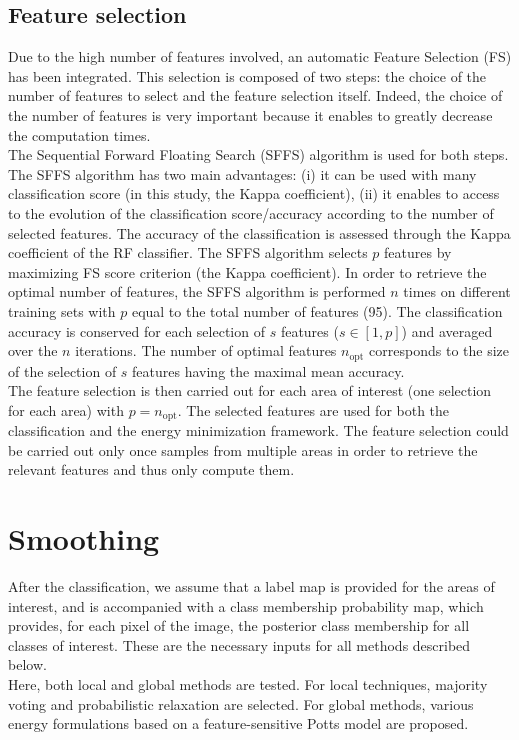 \subsection{Feature selection}
Due to the high number of features involved, an automatic Feature Selection (FS) has been integrated. This selection is composed of two steps: the choice of the number of features to select and the feature selection itself. Indeed, the choice of the number of features is very important because it enables to greatly decrease the computation times. \\
The Sequential Forward Floating Search (SFFS) \citep{pudil1994floating} algorithm is used for both steps. The SFFS algorithm has two main advantages: (i) it can be used with many classification score (in this study, the Kappa coefficient), (ii) it enables to access to the evolution of the classification score/accuracy according to the number of selected features. The accuracy of the classification is assessed through the Kappa coefficient of the RF classifier. The SFFS algorithm selects $p$ features by maximizing FS score criterion (the Kappa coefficient). In order to retrieve the optimal number of features, the SFFS algorithm is performed $n$ times on different training sets with $p$ equal to the total number of features (95). The classification accuracy is conserved for each selection of $s$ features ($s \in [1, p]$) and averaged over the $n$ iterations. The number of optimal features $n_{\text{opt}}$ corresponds to the size of the selection of $s$ features having the maximal mean accuracy. \\
The feature selection is then carried out for each area of interest (one selection for each area) with $p=n_{\text{opt}}$. The selected features are used for both the classification and the energy minimization framework. The feature selection could be carried out only once samples from multiple areas in order to retrieve the relevant features and thus only compute them.

\section{Smoothing}
After the classification, we assume that a label map is provided for the areas of interest, and is accompanied with a class membership probability map, which provides, for each pixel of the image, the posterior class membership for all classes of interest. These are the necessary inputs for all methods described below. \\
Here, both local and global methods are tested. For local techniques, majority voting and probabilistic relaxation are selected. For global methods, various energy formulations based on a feature-sensitive Potts model are proposed.

